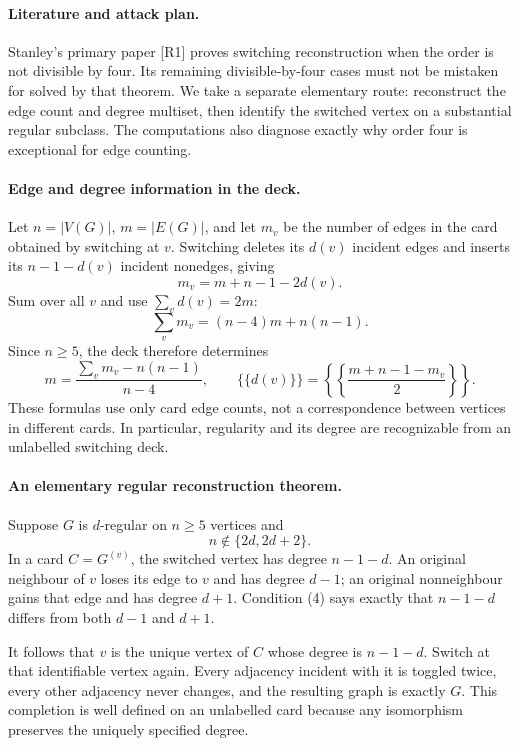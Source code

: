 \documentclass[11pt,a4paper]{article}
\begin{document}
\paragraph{Literature and attack plan.}
Stanley's primary paper [R1] proves switching reconstruction when the order is not divisible by four. Its remaining divisible-by-four cases must not be mistaken for solved by that theorem. We take a separate elementary route: reconstruct the edge count and degree multiset, then identify the switched vertex on a substantial regular subclass. The computations also diagnose exactly why order four is exceptional for edge counting.

\paragraph{Edge and degree information in the deck.}
Let $n=|V(G)|$, $m=|E(G)|$, and let $m_v$ be the number of edges in the card obtained by switching at $v$. Switching deletes its $d(v)$ incident edges and inserts its $n-1-d(v)$ incident nonedges, giving
\[
 m_v=m+n-1-2d(v). \tag{1}
\]
Sum over all $v$ and use $\sum_vd(v)=2m$:
\[
 \sum_vm_v=(n-4)m+n(n-1). \tag{2}
\]
Since $n\ge5$, the deck therefore determines
\[
 m=\frac{\sum_vm_v-n(n-1)}{n-4},
 \qquad
 \{\!\{d(v)\}\!\}
 =\left\{\!\left\{\frac{m+n-1-m_v}{2}\right\}\!\right\}. \tag{3}
\]
These formulas use only card edge counts, not a correspondence between vertices in different cards. In particular, regularity and its degree are recognizable from an unlabelled switching deck.

\paragraph{An elementary regular reconstruction theorem.}
Suppose $G$ is $d$-regular on $n\ge5$ vertices and
\[
 n\notin\{2d,2d+2\}. \tag{4}
\]
In a card $C=G^{(v)}$, the switched vertex has degree $n-1-d$. An original neighbour of $v$ loses its edge to $v$ and has degree $d-1$; an original nonneighbour gains that edge and has degree $d+1$. Condition (4) says exactly that $n-1-d$ differs from both $d-1$ and $d+1$.

It follows that $v$ is the unique vertex of $C$ whose degree is $n-1-d$. Switch at that identifiable vertex again. Every adjacency incident with it is toggled twice, every other adjacency never changes, and the resulting graph is exactly $G$. This completion is well defined on an unlabelled card because any isomorphism preserves the uniquely specified degree.
\end{document}
